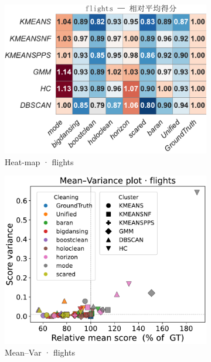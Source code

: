 \documentclass[10pt]{article} %
\numberwithin{equation}{section}
\begin{document}
\begin{figure}[htbp]
  \vspace{0.6em}
  \begin{subfigure}{0.33\linewidth}
    \centering
    \includegraphics[width=\linewidth]{figures/5.3.1graph/heatmap_rel_flights.pdf}
    \caption{Heat-map · flights}
  \end{subfigure}\hfill
  \begin{subfigure}{0.32\linewidth}
    \centering
    \includegraphics[width=\linewidth]{figures/5.3.1graph/mean_var_scatter_flights.pdf}
    \caption{Mean–Var · flights}
  \end{subfigure}\hfill
  \begin{subfigure}{0.34\linewidth}

\end{subfigure}
\end{figure}
\end{document}
